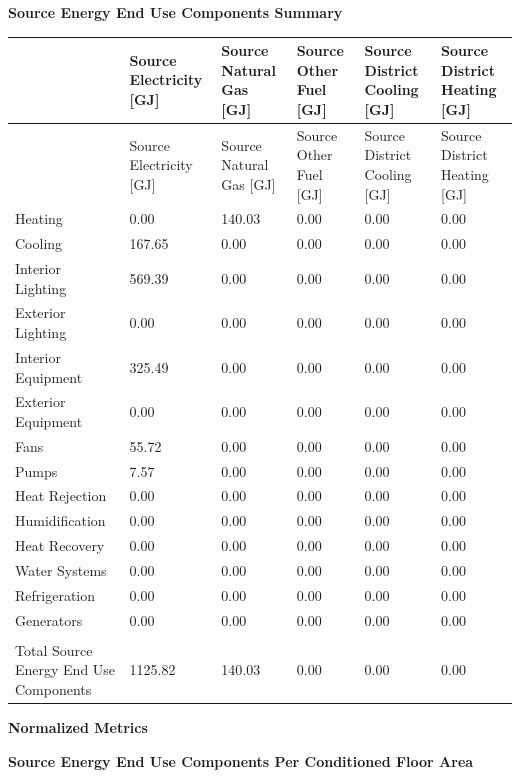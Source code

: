 \textbf{Source Energy End Use Components Summary}

{\scriptsize
\begin{longtable}[c]{>{\raggedright}p{1.0in}>{\raggedright}p{1.0in}>{\raggedright}p{1.0in}>{\raggedright}p{1.0in}>{\raggedright}p{1.0in}>{\raggedright}p{1.0in}}
\toprule
 & Source Electricity [GJ] & Source Natural Gas [GJ] & Source Other Fuel [GJ] & Source District Cooling [GJ] & Source District Heating [GJ] \tabularnewline
\midrule
\endfirsthead

\toprule
 & Source Electricity [GJ] & Source Natural Gas [GJ] & Source Other Fuel [GJ] & Source District Cooling [GJ] & Source District Heating [GJ] \tabularnewline
\midrule
\endhead

Heating & 0.00 & 140.03 & 0.00 & 0.00 & 0.00 \tabularnewline
Cooling & 167.65 & 0.00 & 0.00 & 0.00 & 0.00 \tabularnewline
Interior Lighting & 569.39 & 0.00 & 0.00 & 0.00 & 0.00 \tabularnewline
Exterior Lighting & 0.00 & 0.00 & 0.00 & 0.00 & 0.00 \tabularnewline
Interior Equipment & 325.49 & 0.00 & 0.00 & 0.00 & 0.00 \tabularnewline
Exterior Equipment & 0.00 & 0.00 & 0.00 & 0.00 & 0.00 \tabularnewline
Fans & 55.72 & 0.00 & 0.00 & 0.00 & 0.00 \tabularnewline
Pumps & 7.57 & 0.00 & 0.00 & 0.00 & 0.00 \tabularnewline
Heat Rejection & 0.00 & 0.00 & 0.00 & 0.00 & 0.00 \tabularnewline
Humidification & 0.00 & 0.00 & 0.00 & 0.00 & 0.00 \tabularnewline
Heat Recovery & 0.00 & 0.00 & 0.00 & 0.00 & 0.00 \tabularnewline
Water Systems & 0.00 & 0.00 & 0.00 & 0.00 & 0.00 \tabularnewline
Refrigeration & 0.00 & 0.00 & 0.00 & 0.00 & 0.00 \tabularnewline
Generators & 0.00 & 0.00 & 0.00 & 0.00 & 0.00 \tabularnewline
 &  &  &  &  &  \tabularnewline
Total Source Energy End Use Components & 1125.82 & 140.03 & 0.00 & 0.00 & 0.00 \tabularnewline
\bottomrule
\end{longtable}}

\textbf{Normalized Metrics}

\textbf{Source Energy End Use Components Per Conditioned Floor Area}

